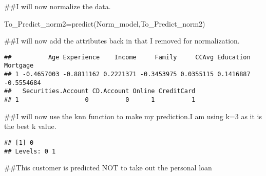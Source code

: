 \documentclass[
]{article}
\newenvironment{Shaded}{\begin{snugshade}}{\end{snugshade}}
\newcommand{\AttributeTok}[1]{\textcolor[rgb]{0.77,0.63,0.00}{#1}}
\newcommand{\DecValTok}[1]{\textcolor[rgb]{0.00,0.00,0.81}{#1}}
\newcommand{\FunctionTok}[1]{\textcolor[rgb]{0.00,0.00,0.00}{#1}}
\newcommand{\NormalTok}[1]{#1}
\newcommand{\OtherTok}[1]{\textcolor[rgb]{0.56,0.35,0.01}{#1}}
\newcommand{\SpecialCharTok}[1]{\textcolor[rgb]{0.00,0.00,0.00}{#1}}
\begin{document}
\#\#I will now normalize the data.

\begin{Shaded}
\begin{Highlighting}[]
\NormalTok{To\_Predict\_norm2}\OtherTok{=}\FunctionTok{predict}\NormalTok{(Norm\_model,To\_Predict\_norm2)}
\end{Highlighting}
\end{Shaded}

\#\#I will now add the attributes back in that I removed for
normalization.

\begin{Shaded}
\end{Shaded}

\begin{verbatim}
##          Age Experience    Income     Family     CCAvg Education   Mortgage
## 1 -0.4657003 -0.8811162 0.2221371 -0.3453975 0.0355115 0.1416887 -0.5554684
##   Securities.Account CD.Account Online CreditCard
## 1                  0          0      1          1
\end{verbatim}

\#\#I will now use the knn function to make my prediction.I am using k=3
as it is the best k value.

\begin{Shaded}
\end{Shaded}

\begin{verbatim}
## [1] 0
## Levels: 0 1
\end{verbatim}

\#\#This customer is predicted NOT to take out the personal loan
\end{document}
